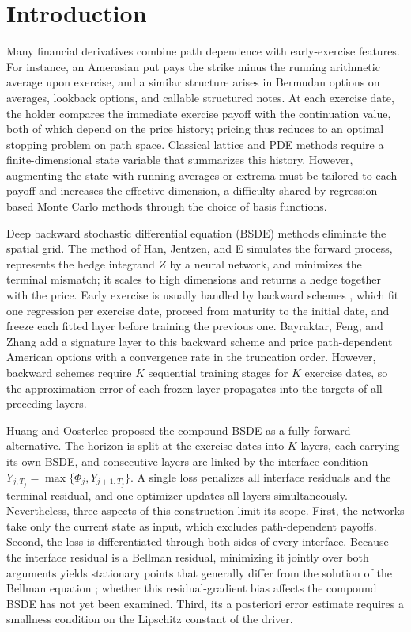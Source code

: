 \section{Introduction}\label{sec:intro}

Many financial derivatives combine path dependence with early-exercise features. For instance, an Amerasian put pays the strike minus the running arithmetic average upon exercise, and a similar structure arises in Bermudan options on averages, lookback options, and callable structured notes. At each exercise date, the holder compares the immediate exercise payoff with the continuation value, both of which depend on the price history; pricing thus reduces to an optimal stopping problem on path space. Classical lattice and PDE methods require a finite-dimensional state variable that summarizes this history. However, augmenting the state with running averages or extrema must be tailored to each payoff and increases the effective dimension, a difficulty shared by regression-based Monte Carlo methods \cite{longstaff2001} through the choice of basis functions.

Deep backward stochastic differential equation (BSDE) methods eliminate the spatial grid. The method of Han, Jentzen, and E \cite{han2018} simulates the forward process, represents the hedge integrand $Z$ by a neural network, and minimizes the terminal mismatch; it scales to high dimensions and returns a hedge together with the price. Early exercise is usually handled by backward schemes \cite{hure2020}, which fit one regression per exercise date, proceed from maturity to the initial date, and freeze each fitted layer before training the previous one. Bayraktar, Feng, and Zhang \cite{bayraktar2024} add a signature layer to this backward scheme and price path-dependent American options with a convergence rate in the truncation order. However, backward schemes require $K$ sequential training stages for $K$ exercise dates, so the approximation error of each frozen layer propagates into the targets of all preceding layers.

Huang and Oosterlee \cite{huang2026} proposed the compound BSDE as a fully forward alternative. The horizon is split at the exercise dates into $K$ layers, each carrying its own BSDE, and consecutive layers are linked by the interface condition $Y_{j,T_j}=\max\{\Phi_j,Y_{j+1,T_j}\}$. A single loss penalizes all interface residuals and the terminal residual, and one optimizer updates all layers simultaneously. Nevertheless, three aspects of this construction limit its scope. First, the networks take only the current state as input, which excludes path-dependent payoffs. Second, the loss is differentiated through both sides of every interface. Because the interface residual is a Bellman residual, minimizing it jointly over both arguments yields stationary points that generally differ from the solution of the Bellman equation \cite{baird1995,sutton2018}; whether this residual-gradient bias affects the compound BSDE has not yet been examined. Third, its a posteriori error estimate requires a smallness condition on the Lipschitz constant of the driver.

